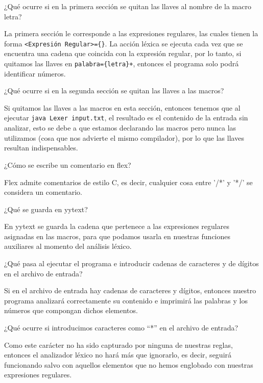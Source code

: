\documentclass[compacto]{aleph-notas}
\begin{document}
\encabezado
\begin{ejer}
¿Qué ocurre si en la primera sección se quitan las llaves al nombre de la macro letra?
\end{ejer}
La primera sección le corresponde a las expresiones regulares, las cuales tienen la forma
\texttt{<Expresión Regular>=\{<Acción Léxica>\}}. La acción léxica se ejecuta cada vez que
se encuentra una cadena que coincida con la expresión regular, por lo tanto, si quitamos las llaves en
\texttt{palabra=\{letra\}+}, entonces el programa solo podrá identificar números.

\begin{ejer}
¿Qué ocurre si en la segunda sección se quitan las llaves a las macros?
\end{ejer}

Si quitamos las llaves a las macros en esta sección, entonces tenemos que al ejecutar \texttt{java Lexer
  input.txt}, el resultado es el contenido de la entrada sin analizar,
esto se debe a que estamos declarando las macros pero nunca
las utilizamos (cosa que nos advierte el mismo compilador), por lo que las llaves resultan indispensables.

\begin{ejer}
¿Cómo se escribe un comentario en flex?
\end{ejer}
Flex admite comentarios de estilo C, es decir, cualquier cosa entre '/*' y '*/' se considera un comentario.
\begin{ejer}
¿Qué se guarda en yytext?
\end{ejer}
En yytext se guarda la cadena que pertenece a las expresiones regulares asignadas en las macros,
para que podamos usarla en nuestras funciones auxiliares al momento del análisis léxico.
\begin{ejer}
¿Qué pasa al ejecutar el programa e introducir cadenas de caracteres y de dígitos en el archivo de entrada?
\end{ejer}
Si en el archivo de entrada hay cadenas de caracteres y dígitos, entonces nuestro
programa analizará correctamente su contenido e imprimirá las palabras y los números que compongan dichos elementos.

\begin{ejer}
¿Qué ocurre si introducimos caracteres como ``*'' en el archivo de entrada?
\end{ejer}
Como este carácter no ha sido capturado por ninguna de nuestras reglas,
entonces el analizador léxico no hará más que ignorarlo, es decir, seguirá funcionando salvo con aquellos elementos que no hemos englobado con nuestras expresiones regulares.
\end{document}
